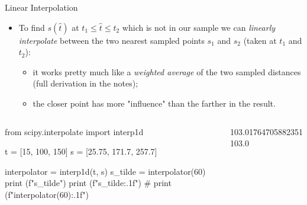 \documentclass{beamer}
\begin{document}
\begin{frame}[fragile]{Linear Interpolation}
  \begin{itemize}
  \item<1-> To find $s(\hat{t})$ at $t_1 \leq \hat{t} \leq t_2$ which is not in our sample we can \emph{linearly interpolate} between the two nearest sampled points $s_1$ and $s_2$ (taken at $t_1$ and $t_2$):
    \begin{itemize}
    \item it works pretty much like a \emph{weighted average} of the two sampled distances (full derivation in the notes);
    \item the closer point has more "influence" than the farther in the result.
    \end{itemize}
  \end{itemize}
  \begin{columns}
\begin{ipython}
from scipy.interpolate import interp1d

t = [15, 100, 150]
s = [25.75, 171.7, 257.7]

interpolator = interp1d(t, s)
s_tilde = interpolator(60)
print (f"{s_tilde}")
print (f"{s_tilde:.1f}")
# print (f"{interpolator(60):.1f}")
\end{ipython}
\begin{ioutput}
103.01764705882351
103.0
\end{ioutput}
  \end{columns}
\end{frame}
\end{document}

